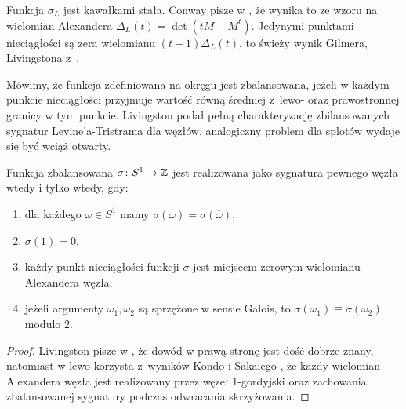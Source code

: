 Funkcja $\sigma_L$ jest kawałkami stała.
Conway pisze w \cite{conway2019}, że wynika to ze wzoru na wielomian Alexandera $\Delta_L(t) = \det(tM - M^t)$.
%
%
Jedynymi punktami nieciągłości są zera wielomianu $(t-1)\Delta_L(t)$, to świeży wynik Gilmera, Livingstona z~\cite{gilmer2016}.
%
%

Mówimy, że funkcja zdefiniowana na okręgu jest zbalansowana, jeżeli w każdym punkcie nieciągłości przyjmuje wartość równą średniej z~lewo- oraz prawostronnej granicy w tym punkcie.
Livingston podał pełną charakteryzację zbilansowanych sygnatur Levine'a-Tristrama dla węzłów, analogiczny problem dla splotów wydaje się być wciąż otwarty.

\begin{proposition}
\label{balanced_iff_four_conditions}%
    Funkcja zbalansowana $\sigma \colon S^1 \to \mathbb Z$ jest realizowana jako sygnatura pewnego węzła wtedy i tylko wtedy, gdy:
    \begin{enumerate}
        \item dla każdego $\omega \in S^1$ mamy $\sigma(\omega) = \sigma(\overline{\omega})$,
        \item $\sigma(1) = 0$,
        \item każdy punkt nieciągłości funkcji $\sigma$ jest miejscem zerowym wielomianu Alexandera węzła,
        \item jeżeli argumenty $\omega_1, \omega_2$ są sprzężone w sensie Galois, to $\sigma(\omega_1) \equiv \sigma(\omega_2)$ modulo $2$.
    \end{enumerate}
\end{proposition}

\begin{proof}
    Livingston pisze w \cite{livingston2018}, że dowód w prawą stronę jest dość dobrze znany, natomiast w lewo korzysta z~wyników Kondo \cite{kondo1979} i Sakaiego \cite{sakai1977}, że każdy wielomian Alexandera węzła jest realizowany przez węzeł 1-gordyjski oraz zachowania zbalansowanej sygnatury podczas odwracania skrzyżowania.
\end{proof}

